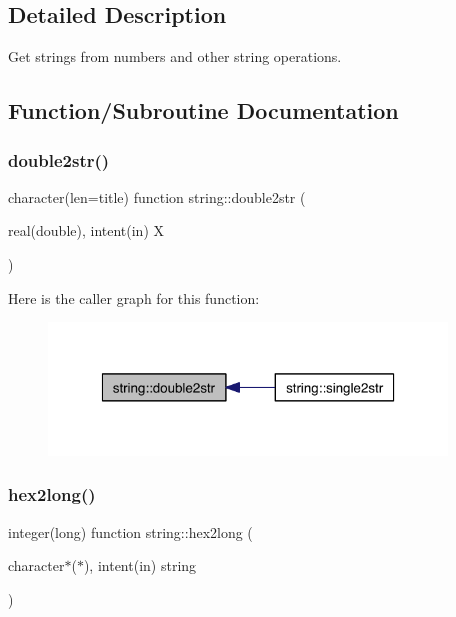 \subsection{Detailed Description}
Get strings from numbers and other string operations. 

\subsection{Function/\+Subroutine Documentation}
\mbox{\label{namespacestring_a229fed3adef608ec305da7cbc54b24a8}} 
\subsubsection{\texorpdfstring{double2str()}{double2str()}}
{\footnotesize\ttfamily character(len=title) function string\+::double2str (\begin{DoxyParamCaption}\item[{real(double), intent(in)}]{X }\end{DoxyParamCaption})\hspace{0.3cm}{\ttfamily [private]}}

Here is the caller graph for this function\+:\nopagebreak
\begin{figure}[H]
\begin{center}
\leavevmode
\includegraphics[width=300pt]{namespacestring_a229fed3adef608ec305da7cbc54b24a8_icgraph}
\end{center}
\end{figure}
\mbox{\label{namespacestring_a133490e9f060a404b52108895b255435}} 
\subsubsection{\texorpdfstring{hex2long()}{hex2long()}}
{\footnotesize\ttfamily integer(long) function string\+::hex2long (\begin{DoxyParamCaption}\item[{character$\ast$($\ast$), intent(in)}]{string }\end{DoxyParamCaption})\hspace{0.3cm}{\ttfamily [private]}}

